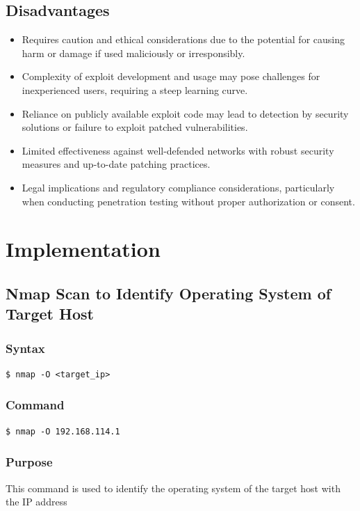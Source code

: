 \documentclass[11pt]{article}
\begin{document}
\subsection{Disadvantages}
\begin{itemize}
    \item Requires caution and ethical considerations due to the potential for causing harm or damage if used maliciously or irresponsibly.
    \item Complexity of exploit development and usage may pose challenges for inexperienced users, requiring a steep learning curve.
    \item Reliance on publicly available exploit code may lead to detection by security solutions or failure to exploit patched vulnerabilities.
    \item Limited effectiveness against well-defended networks with robust security measures and up-to-date patching practices.
    \item Legal implications and regulatory compliance considerations, particularly when conducting penetration testing without proper authorization or consent.
\end{itemize}


\section{Implementation}
\subsection{Nmap Scan to Identify Operating System of Target Host}

\subsubsection*{Syntax}
\begin{verbatim}
$ nmap -O <target_ip>
\end{verbatim}

\subsubsection*{Command}
\begin{verbatim}
$ nmap -O 192.168.114.1
\end{verbatim}

\subsubsection*{Purpose}
This command is used to identify the operating system of the target host with the IP address
\end{document}
